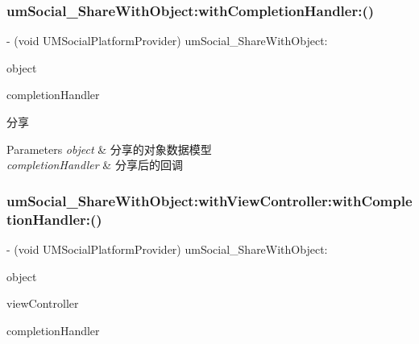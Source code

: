 \subsubsection{\texorpdfstring{um\+Social\+\_\+\+Share\+With\+Object\+:with\+Completion\+Handler\+:()}{umSocial\_ShareWithObject:withCompletionHandler:()}\hspace{0.1cm}{\footnotesize\ttfamily [2/2]}}
{\footnotesize\ttfamily -\/ (void U\+M\+Social\+Platform\+Provider) um\+Social\+\_\+\+Share\+With\+Object\+: \begin{DoxyParamCaption}\item[{(\mbox{\hyperlink{interface_u_m_social_message_object}{U\+M\+Social\+Message\+Object}} $\ast$)}]{object }\item[{withCompletionHandler:(U\+M\+Social\+Request\+Completion\+Handler)}]{completion\+Handler }\end{DoxyParamCaption}}

分享


\begin{DoxyParams}{Parameters}
{\em object} & 分享的对象数据模型 \\
\hline
{\em completion\+Handler} & 分享后的回调 \\
\hline
\end{DoxyParams}
\mbox{\label{protocol_u_m_social_platform_provider_01-p_aaee3cd0e221b820d92575edbbf198c52}} 
\subsubsection{\texorpdfstring{um\+Social\+\_\+\+Share\+With\+Object\+:with\+View\+Controller\+:with\+Completion\+Handler\+:()}{umSocial\_ShareWithObject:withViewController:withCompletionHandler:()}\hspace{0.1cm}{\footnotesize\ttfamily [1/2]}}
{\footnotesize\ttfamily -\/ (void U\+M\+Social\+Platform\+Provider) um\+Social\+\_\+\+Share\+With\+Object\+: \begin{DoxyParamCaption}\item[{(\mbox{\hyperlink{interface_u_m_social_message_object}{U\+M\+Social\+Message\+Object}} $\ast$)}]{object }\item[{withViewController:(U\+I\+View\+Controller $\ast$)}]{view\+Controller }\item[{withCompletionHandler:(U\+M\+Social\+Request\+Completion\+Handler)}]{completion\+Handler }\end{DoxyParamCaption}}

